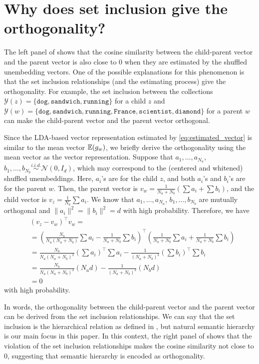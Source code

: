 \documentclass{article}
\newcommand{\ConceptValue}[1]{\texttt{#1}}
\newcommand{\yquad}{\mathcal{Y}}
\begin{document}
\section{Why does set inclusion give the orthogonality?}\label{sec:set_inclusion}
The left panel of  shows that the cosine similarity between the child-parent vector and the parent vector is also close to 0 when they are estimated by the shuffled unembedding vectors.
One of the possible explanations for this phenomenon is that the set inclusion relationships (and the estimating process) give the orthogonality.
For example, the set inclusion between the collections $\yquad(z) =  \{\ConceptValue{dog}, \ConceptValue{sandwich}, \ConceptValue{running}\}$ for a child $z$ and $\yquad(w) =  \{\ConceptValue{dog}, \ConceptValue{sandwich}, \ConceptValue{running}, \ConceptValue{France}, \ConceptValue{scientist}, \ConceptValue{diamond}\}$ for a parent $w$ can make the child-parent vector and the parent vector orthogonal.

Since the LDA-based vector representation estimated by \cref{eq:estimated_vector} is similar to the mean vector $\mathbb{E}(g_w)$, we briefly derive the orthogonality using the mean vector as the vector representation.
Suppose that $a_1, \dots, a_{N_a}$, $b_1, \dots, b_{N_b} \overset{i.i.d.}{\sim} \mathcal{N}(0, I_d)$, which may correspond to the (centered and whitened) shuffled unembeddings.
Here, $a_i$'s are for the child $z$, and both $a_i$'s and $b_i$'s are for the parent $w$.
Then, the parent vector is $v_w= \frac{1}{N_a + N_b} (\sum a_i + \sum b_i)$, and the child vector is $v_z = \frac{1}{N_a} \sum a_i$.
We know that $a_1, \dots, a_{N_a}$, $b_1, \dots, b_{N_b}$ are mutually orthogonal and $\|a_i\|^2 = \|b_i\|^2 = d$ with high probability.
Therefore, we have
\begin{align}
    &(v_z - v_w)^\top v_w = \\
    & = \left(\frac{N_b}{N_a(N_a + N_b)} \sum a_i   - \frac{1}{N_a + N_b} \sum b_i\right)^\top \left(\frac{1}{N_a + N_b} \sum a_i +  \frac{1}{N_a + N_b} \sum b_i\right)\\
    &= \frac{N_b}{N_a(N_a + N_b)^2} (\sum a_i)^\top\sum a_i - \frac{1}{(N_a + N_b)^2}  (\sum b_i)^\top\sum b_i\\
    & =\frac{N_b}{N_a(N_a + N_b)^2}(N_a d) - \frac{1}{(N_a + N_b)^2}  (N_b d)\\
    &=0
\end{align}
with high probability.

In words, the orthogonality between the child-parent vector and the parent vector can be derived from the set inclusion relationships.
We can say that the set inclusion is the hierarchical relation as defined in , but natural semantic hierarchy is our main focus in this paper.
In this context, the right panel of  shows that the violation of the set inclusion relationships makes the cosine similarity not close to 0, suggesting that semantic hierarchy is encoded as orthogonality.
\end{document}
